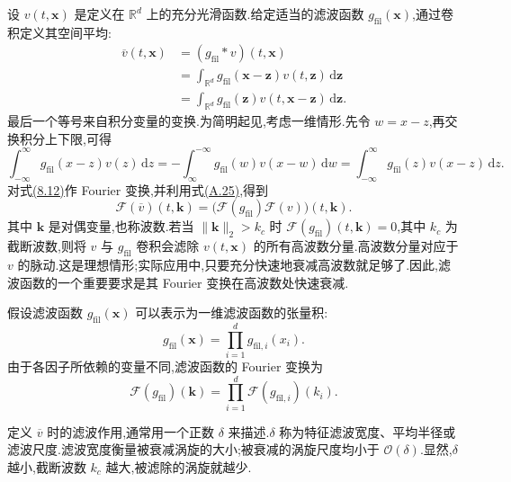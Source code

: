 \begin{note}
\label{note:space-averaging-convolution-filter-wave-number}
设 $v(t,\bm{x})$ 是定义在 $\mathbb{R}^d$ 上的充分光滑函数.给定适当的滤波函数 $g_{\mathrm{fil}}(\bm{x})$,通过卷积定义其空间平均:
\begin{equation}\label{eq:space-average-convolution}
\begin{aligned}
 \overline{v}(t,\bm{x})
  &=(g_{\mathrm{fil}}*v)(t,\bm{x})\\
  &=\int_{\mathbb{R}^d}
      g_{\mathrm{fil}}(\bm{x}-\bm{z})v(t,\bm{z})
      \,\mathrm{d}\bm{z}\\
  &=\int_{\mathbb{R}^d}
      g_{\mathrm{fil}}(\bm{z})v(t,\bm{x}-\bm{z})
      \,\mathrm{d}\bm{z}.
\end{aligned}
\end{equation}
最后一个等号来自积分变量的变换.为简明起见,考虑一维情形.先令 $w=x-z$,再交换积分上下限,可得
\[
 \int_{-\infty}^{\infty}g_{\mathrm{fil}}(x-z)v(z)\,\mathrm{d}z
 =-\int_{\infty}^{-\infty}g_{\mathrm{fil}}(w)v(x-w)\,\mathrm{d}w
 =\int_{-\infty}^{\infty}g_{\mathrm{fil}}(z)v(x-z)\,\mathrm{d}z.
\]
对式\hyperref[eq:space-average-convolution]{(8.12)}作 Fourier 变换,并利用式\hyperref[eq:appendix-a-25]{(A.25)},得到
\begin{equation}\label{eq:fourier-transform-space-average}
 \mathcal{F}(\overline{v})(t,\bm{k})
  =\bigl(\mathcal{F}(g_{\mathrm{fil}})
         \mathcal{F}(v)\bigr)(t,\bm{k}).
\end{equation}
其中 $\bm{k}$ 是对偶变量,也称波数.若当 $\|\bm{k}\|_2>k_c$ 时
$\mathcal{F}(g_{\mathrm{fil}})(t,\bm{k})=0$,其中 $k_c$ 为截断波数,则将 $v$ 与 $g_{\mathrm{fil}}$ 卷积会滤除 $v(t,\bm{x})$ 的所有高波数分量.高波数分量对应于 $v$ 的脉动.这是理想情形;实际应用中,只要充分快速地衰减高波数就足够了.因此,滤波函数的一个重要要求是其 Fourier 变换在高波数处快速衰减.

假设滤波函数 $g_{\mathrm{fil}}(\bm{x})$ 可以表示为一维滤波函数的张量积:
\begin{equation}\label{eq:filter-tensor-product}
 g_{\mathrm{fil}}(\bm{x})
  =\prod_{i=1}^{d}g_{\mathrm{fil},i}(x_i).
\end{equation}
由于各因子所依赖的变量不同,滤波函数的 Fourier 变换为
\[
 \mathcal{F}(g_{\mathrm{fil}})(\bm{k})
  =\prod_{i=1}^{d}\mathcal{F}(g_{\mathrm{fil},i})(k_i).
\]

定义 $\overline{v}$ 时的滤波作用,通常用一个正数 $\delta$ 来描述.$\delta$ 称为特征滤波宽度、平均半径或滤波尺度.滤波宽度衡量被衰减涡旋的大小;被衰减的涡旋尺度均小于 $\mathcal{O}(\delta)$.显然,$\delta$ 越小,截断波数 $k_c$ 越大,被滤除的涡旋就越少.
\end{note}

